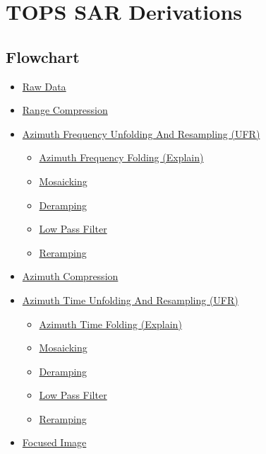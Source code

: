 \documentclass[11pt]{article}
\providecommand{\tightlist}{%
  \setlength{\itemsep}{0pt}\setlength{\parskip}{0pt}}
\begin{document}
\hypertarget{tops-sar-derivations}{%
\section{TOPS SAR Derivations}\label{tops-sar-derivations}}

\hypertarget{flowchart}{%
\subsection{Flowchart}\label{flowchart}}

\begin{itemize}
\tightlist
\item
  \protect\hyperlink{1-raw-data}{Raw Data}
\item
  \protect\hyperlink{2-range-compression}{Range Compression}
\item
  \protect\hyperlink{3-azimuth-frequency-unfolding-and-resampling-ufr}{Azimuth
  Frequency Unfolding And Resampling (UFR)}

  \begin{itemize}
  \tightlist
  \item
    \protect\hyperlink{31-azimuth-frequency-folding-explain}{Azimuth
    Frequency Folding (Explain)}
  \item
    \protect\hyperlink{32-mosaicking}{Mosaicking}
  \item
    \protect\hyperlink{33-deramping}{Deramping}
  \item
    \protect\hyperlink{34-low-pass-filter}{Low Pass Filter}
  \item
    \protect\hyperlink{35-reramping}{Reramping}
  \end{itemize}
\item
  \protect\hyperlink{4-azimuth-compression}{Azimuth Compression}
\item
  \protect\hyperlink{5-azimuth-time-unfolding-and-resampling-ufr}{Azimuth
  Time Unfolding And Resampling (UFR)}

  \begin{itemize}
  \tightlist
  \item
    \protect\hyperlink{51-azimuth-time-folding-explain}{Azimuth Time
    Folding (Explain)}
  \item
    \protect\hyperlink{52-mosaicking}{Mosaicking}
  \item
    \protect\hyperlink{53-deramping}{Deramping}
  \item
    \protect\hyperlink{54-low-pass-filter}{Low Pass Filter}
  \item
    \protect\hyperlink{55-reramping}{Reramping}
  \end{itemize}
\item
  \protect\hyperlink{6-focused-image}{Focused Image}
\end{itemize}
\end{document}

